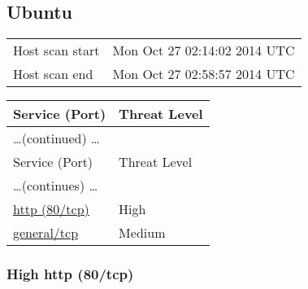 \documentclass{article}
\begin{document}
\subsection{Ubuntu}
\label{host:192.168.248.129}

\begin{tabular}{ll}
Host scan start&Mon Oct 27 02:14:02 2014 UTC\\
Host scan end&Mon Oct 27 02:58:57 2014 UTC\\
\end{tabular}

\begin{longtable}{|l|l|}
\hline
\rowcolor{openvas_report}Service (Port)&Threat Level\\
\hline
\endfirsthead
\multicolumn{2}{l}{\hfill\ldots (continued) \ldots}\\
\hline
\rowcolor{openvas_report}Service (Port)&Threat Level\\
\hline
\endhead
\hline
\multicolumn{2}{l}{\ldots (continues) \ldots}\\
\endfoot
\hline
\endlastfoot
\hline
\hyperref[port:192.168.248.129 http (80/tcp) High]{http (80/tcp)}&High\\
\hline
\hyperref[port:192.168.248.129 general/tcp Medium]{general/tcp}&Medium\\
\hline
\end{longtable}



\subsubsection{High http (80/tcp)}
\label{port:192.168.248.129 http (80/tcp) High}
\end{document}
